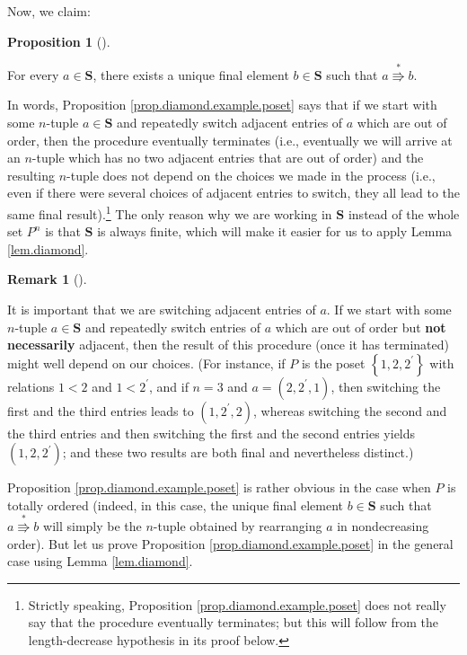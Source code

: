 \documentclass[numbers=enddot,12pt,final,onecolumn,notitlepage]{scrartcl}%
\theoremstyle{definition}
\newtheorem{prop}[theo]{Proposition}
\newenvironment{proposition}[1][]
{\begin{prop}[#1]\begin{leftbar}}
{\end{leftbar}\end{prop}}
\newtheorem{remk}[theo]{Remark}
\newenvironment{remark}[1][]
{\begin{remk}[#1]\begin{leftbar}}
{\end{leftbar}\end{remk}}
\begin{document}
Now, we claim:

\begin{proposition}
\label{prop.diamond.example.poset}For every $a\in\mathbf{S}$, there exists a
unique final element $b\in\mathbf{S}$ such that $a\overset{\ast}{\Rrightarrow
}b$.
\end{proposition}

In words, Proposition \ref{prop.diamond.example.poset} says that if we start
with some $n$-tuple $a\in\mathbf{S}$ and repeatedly switch adjacent entries of
$a$ which are out of order, then the procedure eventually terminates (i.e.,
eventually we will arrive at an $n$-tuple which has no two adjacent entries
that are out of order) and the resulting $n$-tuple does not depend on the
choices we made in the process (i.e., even if there were several choices of
adjacent entries to switch, they all lead to the same final
result).\footnote{Strictly speaking, Proposition
\ref{prop.diamond.example.poset} does not really say that the procedure
eventually terminates; but this will follow from the length-decrease
hypothesis in its proof below.} The only reason why we are working in
$\mathbf{S}$ instead of the whole set $P^{n}$ is that $\mathbf{S}$ is always
finite, which will make it easier for us to apply Lemma \ref{lem.diamond}.

\begin{remark}
It is important that we are switching adjacent entries of $a$. If we start
with some $n$-tuple $a\in\mathbf{S}$ and repeatedly switch entries of $a$
which are out of order but \textbf{not necessarily} adjacent, then the result
of this procedure (once it has terminated) might well depend on our choices.
(For instance, if $P$ is the poset $\left\{  1,2,2^{\prime}\right\}  $ with
relations $1<2$ and $1<2^{\prime}$, and if $n=3$ and $a=\left(  2,2^{\prime
},1\right)  $, then switching the first and the third entries leads to
$\left(  1,2^{\prime},2\right)  $, whereas switching the second and the third
entries and then switching the first and the second entries yields $\left(
1,2,2^{\prime}\right)  $; and these two results are both final and
nevertheless distinct.)
\end{remark}

Proposition \ref{prop.diamond.example.poset} is rather obvious in the case
when $P$ is totally ordered (indeed, in this case, the unique final element
$b\in\mathbf{S}$ such that $a\overset{\ast}{\Rrightarrow}b$ will simply be the
$n$-tuple obtained by rearranging $a$ in nondecreasing order). But let us
prove Proposition \ref{prop.diamond.example.poset} in the general case using
Lemma \ref{lem.diamond}.
\end{document}
